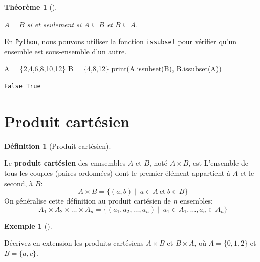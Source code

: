 \documentclass[
  letterpaper,
]{scrbook}
\newenvironment{Shaded}{}{}
\newcommand{\BuiltInTok}[1]{#1}
\newcommand{\DecValTok}[1]{\textcolor[rgb]{0.25,0.63,0.44}{#1}}
\newcommand{\NormalTok}[1]{#1}
\newcommand{\OperatorTok}[1]{\textcolor[rgb]{0.40,0.40,0.40}{#1}}
\newcommand{\set}[1]{\{#1\}}
\theoremstyle{plain}
\newtheorem{theorem}{Théorème}[chapter]
\theoremstyle{definition}
\newtheorem{example}{Exemple}[chapter]
\theoremstyle{definition}
\newtheorem{definition}{Définition}[chapter]
\theoremstyle{remark}
\begin{document}
\leavevmode{}%
\begin{theorem}[]\label{thm-sous-ensemble-egalite-ensemble}

\(A=B\) si et seulement si \(A\subseteq B\) et \(B\subseteq A\).

\end{theorem}

En \texttt{Python}, nous pouvons utiliser la fonction \texttt{issubset}
pour vérifier qu'un ensemble est sous-ensemble d'un autre.

\hypertarget{sous-ensemble-verification}{}
\begin{Shaded}
\begin{Highlighting}[]
\NormalTok{A }\OperatorTok{=}\NormalTok{ \{}\DecValTok{2}\NormalTok{,}\DecValTok{4}\NormalTok{,}\DecValTok{6}\NormalTok{,}\DecValTok{8}\NormalTok{,}\DecValTok{10}\NormalTok{,}\DecValTok{12}\NormalTok{\}}
\NormalTok{B }\OperatorTok{=}\NormalTok{ \{}\DecValTok{4}\NormalTok{,}\DecValTok{8}\NormalTok{,}\DecValTok{12}\NormalTok{\}}
\BuiltInTok{print}\NormalTok{(A.issubset(B), B.issubset(A))}
\end{Highlighting}
\end{Shaded}

\begin{verbatim}
False True
\end{verbatim}

\hypertarget{produit-cartuxe9sien}{%
\section{Produit cartésien}\label{produit-cartuxe9sien}}

\leavevmode{}%
\begin{definition}[Produit cartésien]\label{def-produit-cartesien}

Le \textbf{produit cartésien} des ennsembles \(A\) et \(B\), noté
\(A\times B\), est L'ensemble de tous les couples (paires ordonnées)
dont le premier élément appartient à \(A\) et le second, à \(B\): \[
A\times B = \set{(a,b)\mid\ a\in A\ \text{et}\ b\in B}
\] On généralise cette définition au produit cartésien de \(n\)
ensembles: \[
A_1 \times A_2 \times \ldots \times A_n = \set{(a_1,a_2,\ldots,a_n)\mid\ a_1\in A_1,\ldots, a_n\in A_n}
\]

\end{definition}

\leavevmode{}%
\begin{example}[]\label{exm-ensembles-extension-produit-cartesien}

Décrivez en extension les produits cartésiens \(A\times B\) et
\(B\times A\), où \(A=\set{0,1,2}\) et \(B=\set{a,c}\).

\end{example}
\end{document}
